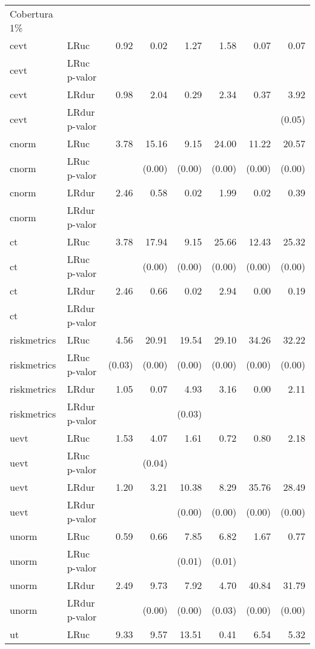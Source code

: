 \begin{longtable}{llrrrrrr}
Cobertura 1\% &  &  &  &  &  &  &  \\ 
  cevt & LRuc & 0.92 & 0.02 & 1.27 & 1.58 & 0.07 & 0.07 \\ 
  cevt & LRuc p-valor &  &  &  &  &  &  \\ 
  cevt & LRdur & 0.98 & 2.04 & 0.29 & 2.34 & 0.37 & 3.92 \\ 
  cevt & LRdur p-valor &  &  &  &  &  & (0.05) \\ 
  cnorm & LRuc & 3.78 & 15.16 & 9.15 & 24.00 & 11.22 & 20.57 \\ 
  cnorm & LRuc p-valor &  & (0.00) & (0.00) & (0.00) & (0.00) & (0.00) \\ 
  cnorm & LRdur & 2.46 & 0.58 & 0.02 & 1.99 & 0.02 & 0.39 \\ 
  cnorm & LRdur p-valor &  &  &  &  &  &  \\ 
  ct & LRuc & 3.78 & 17.94 & 9.15 & 25.66 & 12.43 & 25.32 \\ 
  ct & LRuc p-valor &  & (0.00) & (0.00) & (0.00) & (0.00) & (0.00) \\ 
  ct & LRdur & 2.46 & 0.66 & 0.02 & 2.94 & 0.00 & 0.19 \\ 
  ct & LRdur p-valor &  &  &  &  &  &  \\ 
  riskmetrics & LRuc & 4.56 & 20.91 & 19.54 & 29.10 & 34.26 & 32.22 \\ 
  riskmetrics & LRuc p-valor & (0.03) & (0.00) & (0.00) & (0.00) & (0.00) & (0.00) \\ 
  riskmetrics & LRdur & 1.05 & 0.07 & 4.93 & 3.16 & 0.00 & 2.11 \\ 
  riskmetrics & LRdur p-valor &  &  & (0.03) &  &  &  \\ 
  uevt & LRuc & 1.53 & 4.07 & 1.61 & 0.72 & 0.80 & 2.18 \\ 
  uevt & LRuc p-valor &  & (0.04) &  &  &  &  \\ 
  uevt & LRdur & 1.20 & 3.21 & 10.38 & 8.29 & 35.76 & 28.49 \\ 
  uevt & LRdur p-valor &  &  & (0.00) & (0.00) & (0.00) & (0.00) \\ 
  unorm & LRuc & 0.59 & 0.66 & 7.85 & 6.82 & 1.67 & 0.77 \\ 
  unorm & LRuc p-valor &  &  & (0.01) & (0.01) &  &  \\ 
  unorm & LRdur & 2.49 & 9.73 & 7.92 & 4.70 & 40.84 & 31.79 \\ 
  unorm & LRdur p-valor &  & (0.00) & (0.00) & (0.03) & (0.00) & (0.00) \\ 
  ut & LRuc & 9.33 & 9.57 & 13.51 & 0.41 & 6.54 & 5.32 \\ 

\end{longtable}
